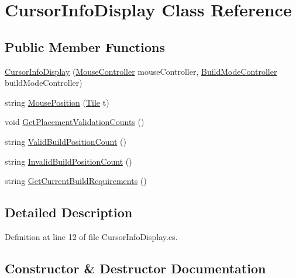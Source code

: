 \hypertarget{class_cursor_info_display}{}\section{Cursor\+Info\+Display Class Reference}
\label{class_cursor_info_display}
\subsection*{Public Member Functions}
\begin{DoxyCompactItemize}
\item 
\hyperlink{class_cursor_info_display_abd1d8ae7a95b337b689768a5e7a71edb}{Cursor\+Info\+Display} (\hyperlink{class_mouse_controller}{Mouse\+Controller} mouse\+Controller, \hyperlink{class_build_mode_controller}{Build\+Mode\+Controller} build\+Mode\+Controller)
\item 
string \hyperlink{class_cursor_info_display_a850e2aa1a8a481ba1041b48328289cc7}{Mouse\+Position} (\hyperlink{class_tile}{Tile} t)
\item 
void \hyperlink{class_cursor_info_display_a79dddab21d35ca31728e8bf8b027a7f7}{Get\+Placement\+Validation\+Counts} ()
\item 
string \hyperlink{class_cursor_info_display_af0c4886130f3618be3c05c4642208d38}{Valid\+Build\+Position\+Count} ()
\item 
string \hyperlink{class_cursor_info_display_ad7eebf309a8eae30a13155cefe80b198}{Invalid\+Build\+Position\+Count} ()
\item 
string \hyperlink{class_cursor_info_display_a80998051ea382afb9512ccf5623a14e6}{Get\+Current\+Build\+Requirements} ()
\end{DoxyCompactItemize}


\subsection{Detailed Description}


Definition at line 12 of file Cursor\+Info\+Display.\+cs.



\subsection{Constructor \& Destructor Documentation}
\mbox{\label{class_cursor_info_display_abd1d8ae7a95b337b689768a5e7a71edb}} 
